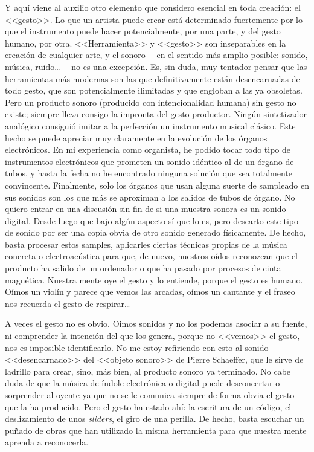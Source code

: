Y aquí viene al auxilio otro elemento que considero esencial en toda creación: el <<gesto>>. Lo que un artista puede crear está determinado fuertemente por lo que el instrumento puede hacer potencialmente, por una parte, y del gesto humano, por  otra. <<Herramienta>> y <<gesto>> son inseparables en la creación de cualquier arte, y el sonoro ---en el sentido más amplio posible: sonido, música, ruido\dots--- no es una excepción. Es, sin duda, muy tentador pensar que las herramientas más modernas son las que definitivamente están desencarnadas de todo gesto, que son potencialmente ilimitadas y que engloban a las ya obsoletas. Pero un producto sonoro (producido con intencionalidad humana) sin gesto no existe; siempre lleva consigo la impronta del gesto productor. Ningún sintetizador analógico consiguió imitar a la perfección un instrumento musical clásico. Este hecho se puede apreciar muy claramente en la evolución de los órganos electrónicos. En mi experiencia como organista, he podido tocar todo tipo de instrumentos electrónicos que prometen un sonido idéntico al de un órgano de tubos, y hasta la fecha no he encontrado ninguna solución que sea totalmente convincente. Finalmente, solo los órganos que usan alguna suerte de sampleado en sus sonidos son los que más se aproximan a los  salidos de tubos de órgano. No quiero entrar en una discusión sin fin de si una muestra sonora es un sonido digital. Desde luego que bajo algún aspecto sí que lo es, pero descarto este tipo de sonido por ser una copia obvia de otro sonido generado físicamente. De hecho, basta procesar estos samples, aplicarles ciertas técnicas propias de la música concreta o electroacústica para que, de nuevo, nuestros oídos reconozcan que el producto ha salido de un ordenador o que ha pasado por procesos de cinta magnética. Nuestra mente oye el gesto y lo entiende, porque el gesto es humano. Oímos un violín y parece que vemos las arcadas, oímos un cantante y el fraseo nos recuerda el gesto de respirar\dots 

A veces el gesto no es obvio. Oimos sonidos y no los podemos asociar a su fuente, ni comprender la intención del que los genera, porque no <<vemos>> el gesto, nos es imposible identificarlo. No me estoy refiriendo con esto al sonido <<desencarnado>> del <<objeto sonoro>> de Pierre Schaeffer, que le sirve de ladrillo para crear, sino, más bien, al producto sonoro ya terminado. No cabe duda de que la música de índole electrónica o digital puede desconcertar o sorprender al oyente ya que no se le comunica siempre de forma obvia el gesto que la ha producido. Pero el gesto ha estado ahí: la escritura de un código, el deslizamiento de unos \textit{sliders}, el giro de una perilla. De hecho, basta escuchar un puñado de obras que han utilizado la misma herramienta para que nuestra mente aprenda a reconocerla.


